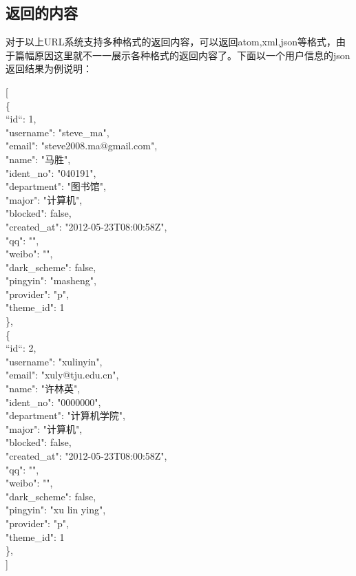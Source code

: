 \subsection{返回的内容}
\label{sec:content}

对于以上URL系统支持多种格式的返回内容，可以返回atom,xml,json等格式，由于篇幅原因这里就不一一展示各种格式的返回内容了。下面以一个用户信息的json返回结果为例说明：
\begin{bframe}

[\\
    \{\\
        ``id``: 1,\\
        "username": "steve\_ma",\\
        "email": "steve2008.ma@gmail.com",\\
        "name": "马胜",\\
        "ident\_no": "040191",\\
        "department": "图书馆",\\
        "major": "计算机",\\
        "blocked": false,\\
        "created\_at": "2012-05-23T08:00:58Z",\\
        "qq": "",\\
        "weibo": "",\\
        "dark\_scheme": false,\\
        "pingyin": "masheng",\\
        "provider": "p",\\
        "theme\_id": 1\\
       \},\\
       \{\\
        ``id``: 2,\\
        "username": "xulinyin",\\
        "email": "xuly@tju.edu.cn",\\
        "name": "许林英",\\
        "ident\_no": "0000000",\\
        "department": "计算机学院",\\
        "major": "计算机",\\
        "blocked": false,\\
        "created\_at": "2012-05-23T08:00:58Z",\\
        "qq": "",\\
        "weibo": "",\\
        "dark\_scheme": false,\\
        "pingyin": "xu lin ying",\\
        "provider": "p",\\
        "theme\_id": 1\\
      \},\\
]\\
\end{bframe}

